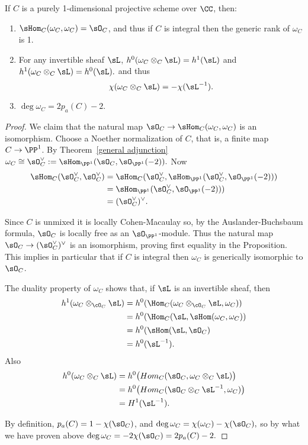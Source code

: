 \begin{proposition}\label{similarities}
If $C$ is a purely 1-dimensional projective scheme over $\CC$, then:
\begin{enumerate}

\item $\sHom_C(\omega_C, \omega_C) = \sO_C$, and  thus if $C$ is integral then the generic rank of $\omega_C$ is 1.

\item For any invertible sheaf $\sL$, 
$h^0(\omega_C\otimes_C\sL ) = h^1(\sL)$ and
$h^1(\omega_C\otimes_C\sL)= h^0(\sL).$
and thus
$$
\chi(\omega_C\otimes_C\sL)= -\chi(\sL^{-1}).
$$

\item $\deg \omega_C = 2p_a(C) -2.$

\end{enumerate}
\end{proposition}

\begin{proof}
 We claim that the natural map $\sO_C \to \sHom_C(\omega_C, \omega_C)$ is an isomorphism. Choose a Noether
normalization of $C$, that is, a finite map $C\to \PP^1$.
By Theorem~\ref{general adjunction} $\omega_C \cong \sO_C^\vee := \sHom_{\PP^1}(\sO_C,\sO_{\PP^1}(-2)).$
Now
$$
\begin{aligned}
\sHom_{C}(\sO_C^\vee,\sO_C^\vee ) &=\sHom_{C}(\sO_C^\vee, \sHom_{\PP^1}(\sO_C^\vee,\sO_{\PP^1}(-2)))\\
&= \sHom_{\PP^1}(\sO_C^\vee, \sO_{\PP^1}(-2)))\\
&= (\sO_C^\vee)^\vee.
\end{aligned}
$$

Since $C$ is unmixed it is locally Cohen-Macaulay so, by the Auslander-Buchsbaum formula, 
$\sO_C$ is locally free as an $\sO_{\PP^1}$-module.
Thus the natural map $\sO_C \to (\sO_C^\vee)^\vee$ is an isomorphism, proving first equality in the Proposition.
This implies in particular that if $C$ is integral then $\omega_C$ is generically isomorphic to $\sO_C$.

 The duality property of $\omega_C$ shows that, if $\sL$ is an invertible sheaf, then
$$
\begin{aligned}
h^1(\omega_C \otimes_{\cO_C} \sL) &= h^0(\Hom_C(\omega_C\otimes_{\cO_C} \sL, \omega_C))\\
&= h^0(\Hom_C(\sL, \sHom(\omega_C,\omega_C))\\
&=h^0 (\sHom(\sL, \sO_C)\\
&= h^0(\sL^{-1}).
\end{aligned}
$$
Also
$$
\begin{aligned}
h^0(\omega_C\otimes_C\sL) &= h^0 \bigl(Hom_C(\sO_C, \omega_C\otimes_C\sL)\bigr)\\
&=h^0 \bigl(Hom_C(\sO_C\otimes_C\sL^{-1}, \omega_C)\bigr)\\
&=H^1 (\sL^{-1}). 
\end{aligned}
$$

 By definition, $p_a(C) = 1-\chi(\sO_C)$, and 
 $\deg \omega_C = \chi(\omega_C) - \chi(\sO_C),$
 so by what we have proven above
 $\deg \omega_C = -2\chi(\sO_C) = 2p_a(C)-2.$
 \end{proof}

